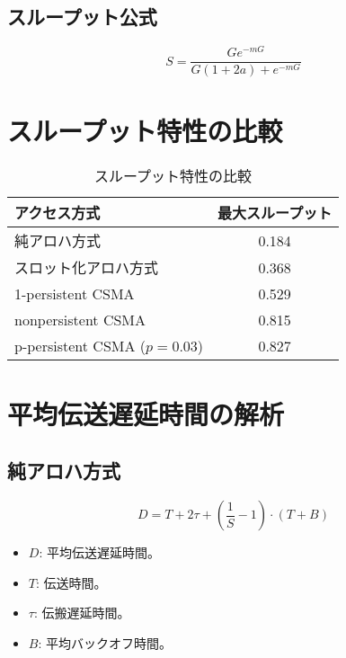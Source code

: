 \documentclass[a4paper,12pt]{ltjsarticle}
\begin{document}
\subsection*{スループット公式}
\[
S = \frac{G e^{-mG}}{G (1 + 2a) + e^{-mG}}
\]

\newpage

\section{スループット特性の比較}

\begin{table}[h]
    \centering
    \begin{tabular}{@{}lc@{}}
    \toprule
    アクセス方式 & 最大スループット \\ \midrule
    純アロハ方式 & 0.184 \\
    スロット化アロハ方式 & 0.368 \\
    1-persistent CSMA & 0.529 \\
    nonpersistent CSMA & 0.815 \\
    p-persistent CSMA (\( p = 0.03 \)) & 0.827 \\ \bottomrule
    \end{tabular}
    \caption{スループット特性の比較}
\end{table}

\section{平均伝送遅延時間の解析}

\subsection*{純アロハ方式}
\[
D = T + 2\tau + \left(\frac{1}{S} - 1\right) \cdot (T + B)
\]
\begin{itemize}
    \item \( D \): 平均伝送遅延時間。
    \item \( T \): 伝送時間。
    \item \( \tau \): 伝搬遅延時間。
    \item \( B \): 平均バックオフ時間。
\end{itemize}
\end{document}
